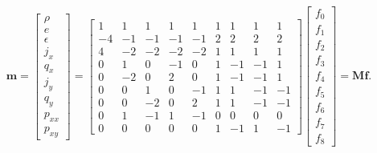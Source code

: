 \documentclass{article}
\newcommand{\transM}{\mathbf{M}}
\begin{document}
\begin{equation} \label{eq:transformation-matrix}
\mathbf{m} = \begin{bmatrix}
\rho \\ e \\ \epsilon \\ j_x \\ q_x \\ j_y \\ q_y \\ p_{xx} \\ p_{xy}
\end{bmatrix} = \begin{bmatrix}
1 & 1 & 1 & 1 & 1 & 1 & 1 & 1 & 1 \\
-4 & -1 & -1 & -1 & -1 & 2 & 2 & 2 & 2 \\
4 & -2 & -2 & -2 & -2 & 1 & 1 & 1 & 1 \\
0 & 1 & 0 & -1 & 0 & 1 & -1 & -1 & 1 \\
0 & -2 & 0 & 2 & 0 & 1 & -1 & -1 & 1 \\
0 & 0 & 1 & 0 & -1 & 1 & 1 & -1 & -1 \\
0 & 0 & -2 & 0 & 2 & 1 & 1 & -1 & -1 \\
0 & 1 & -1 & 1 & -1 & 0 & 0 & 0 & 0 \\
0 & 0 & 0 & 0 & 0 & 1 & -1 & 1 & -1
\end{bmatrix} \begin{bmatrix}
f_0 \\
f_1 \\
f_2 \\
f_3 \\
f_4 \\
f_5 \\
f_6 \\
f_7 \\
f_8
\end{bmatrix} = \transM \mathbf{f}.
\end{equation}
\end{document}
